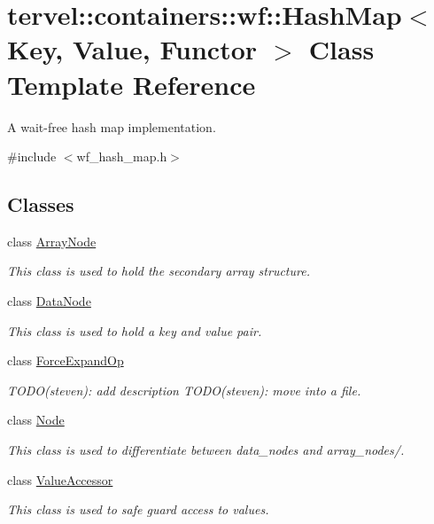 \hypertarget{classtervel_1_1containers_1_1wf_1_1_hash_map}{}\section{tervel\+:\+:containers\+:\+:wf\+:\+:Hash\+Map$<$ Key, Value, Functor $>$ Class Template Reference}
\label{classtervel_1_1containers_1_1wf_1_1_hash_map}


A wait-\/free hash map implementation.  




{\ttfamily \#include $<$wf\+\_\+hash\+\_\+map.\+h$>$}

\subsection*{Classes}
\begin{DoxyCompactItemize}
\item 
class \hyperlink{classtervel_1_1containers_1_1wf_1_1_hash_map_1_1_array_node}{Array\+Node}
\begin{DoxyCompactList}\small\item\em This class is used to hold the secondary array structure. \end{DoxyCompactList}\item 
class \hyperlink{classtervel_1_1containers_1_1wf_1_1_hash_map_1_1_data_node}{Data\+Node}
\begin{DoxyCompactList}\small\item\em This class is used to hold a key and value pair. \end{DoxyCompactList}\item 
class \hyperlink{classtervel_1_1containers_1_1wf_1_1_hash_map_1_1_force_expand_op}{Force\+Expand\+Op}
\begin{DoxyCompactList}\small\item\em T\+O\+D\+O(steven)\+: add description T\+O\+D\+O(steven)\+: move into a file. \end{DoxyCompactList}\item 
class \hyperlink{classtervel_1_1containers_1_1wf_1_1_hash_map_1_1_node}{Node}
\begin{DoxyCompactList}\small\item\em This class is used to differentiate between data\+\_\+nodes and array\+\_\+nodes/. \end{DoxyCompactList}\item 
class \hyperlink{classtervel_1_1containers_1_1wf_1_1_hash_map_1_1_value_accessor}{Value\+Accessor}
\begin{DoxyCompactList}\small\item\em This class is used to safe guard access to values. \end{DoxyCompactList}\end{DoxyCompactItemize}

